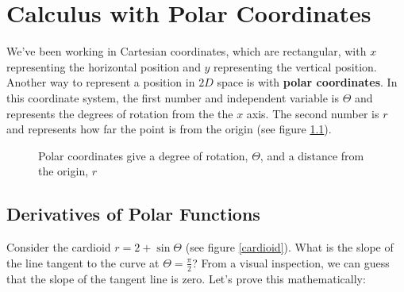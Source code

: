 \chapter{Calculus with Polar Coordinates}

We've been working in Cartesian coordinates, which are rectangular, with $x$ representing the horizontal position and $y$ representing the vertical position. Another way to represent a position in $2D$ space is with \textbf{polar coordinates}. In this coordinate system, the first number and independent variable is $\Theta$ and represents the degrees of rotation from the the $x$ axis. The second number is $r$ and represents how far the point is from the origin (see figure \ref{polarex}). 

\begin{figure}[htbp]
\centering
    \label{polarex}
    \caption{Polar coordinates give a degree of rotation, $\Theta$, and a distance from the origin, $r$}
    \end{figure}

\section{Derivatives of Polar Functions}
Consider the cardioid $r = 2 + \sin{\Theta}$ (see figure \ref{cardioid}). What is the slope of the line tangent to the curve at $\Theta = \frac{\pi}{2}$? From a visual inspection, we can guess that the slope of the tangent line is zero. Let's prove this mathematically:

